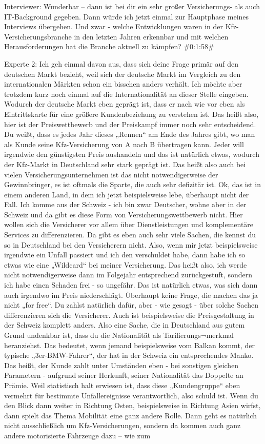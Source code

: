 Interviewer:
Wunderbar – dann ist bei dir ein sehr großer Versicherungs- als auch IT-Background gegeben. Dann würde ich jetzt einmal zur Hauptphase meines Interviews übergehen. Und zwar - welche Entwicklungen waren in der Kfz-Versicherungsbranche in den letzten Jahren erkennbar und mit welchen Herausforderungen hat die Branche aktuell zu kämpfen?
\#0:1:58\#

Experte 2:
Ich geh einmal davon aus, dass sich deine Frage primär auf den deutschen Markt bezieht, weil sich der deutsche Markt im Vergleich zu den internationalen Märkten schon ein bisschen anders verhält. Ich möchte aber trotzdem kurz noch einmal auf die Internationalität an dieser Stelle eingeben. Wodurch der deutsche Markt eben geprägt ist, dass er nach wie vor eben als Eintrittskarte für eine größere Kundenbeziehung zu verstehen ist. Das heißt also, hier ist der Preiswettbewerb und der Preiskampf immer noch sehr entscheidend. Du weißt, dass es jedes Jahr dieses „Rennen“ am Ende des Jahres gibt, wo man als Kunde seine Kfz-Versicherung von A nach B übertragen kann. Jeder will irgendwie den günstigsten Preis aushandeln und das ist natürlich etwas, wodurch der Kfz-Markt in Deutschland sehr stark geprägt ist. Das heißt also auch bei vielen Versicherungsunternehmen ist das nicht notwendigerweise der Gewinnbringer, es ist oftmals die Sparte, die auch sehr defizitär ist. Ok, das ist in einem anderen Land, in dem ich jetzt beispielsweise lebe, überhaupt nicht der Fall. Ich komme aus der Schweiz - ich bin zwar Deutscher, wohne aber in der Schweiz und da gibt es diese Form von Versicherungswettbewerb nicht. Hier wollen sich die Versicherer vor allem über Dienstleistungen und komplementäre Services zu differenzieren. Da gibt es eben auch sehr viele Sachen, die kennst du so in Deutschland bei den Versicherern nicht. Also, wenn mir jetzt beispielsweise irgendwie ein Unfall passiert und ich den verschuldet habe, dann habe ich so etwas wie eine „Wildcard“ bei meiner Versicherung. Das heißt also, ich werde nicht notwendigerweise dann im Folgejahr entsprechend zurückgestuft, sondern ich habe einen Schaden frei - so ungefähr. Das ist natürlich etwas, was sich dann auch irgendwo im Preis niederschlägt. Überhaupt keine Frage, die machen das ja nicht „for free“. Du zahlst natürlich dafür, aber - wie gesagt - über solche Sachen differenzieren sich die Versicherer. Auch ist beispielsweise die Preisgestaltung in der Schweiz komplett anders. Also eine Sache, die in Deutschland aus gutem Grund undenkbar ist, dass du die Nationalität als Tarifierungs¬merkmal heranziehst. Das bedeutet, wenn jemand beispielsweise vom Balkan kommt, der typische „3er-BMW-Fahrer“, der hat in der Schweiz ein entsprechendes Manko. Das heißt, der Kunde zahlt unter Umständen eben - bei sonstigen gleichen Parametern - aufgrund seiner Herkunft, seiner Nationalität das Doppelte an Prämie. Weil statistisch halt erwiesen ist, dass diese „Kundengruppe“ eben vermehrt für bestimmte Unfallereignisse verantwortlich, also schuld ist. Wenn du den Blick dann weiter in Richtung Osten, beispielsweise in Richtung Asien wirfst, dann spielt das Thema Mobilität eine ganz andere Rolle. Dann geht es natürlich nicht ausschließlich um Kfz-Versicherungen, sondern da kommen auch ganz andere motorisierte Fahrzeuge dazu –  wie zum 